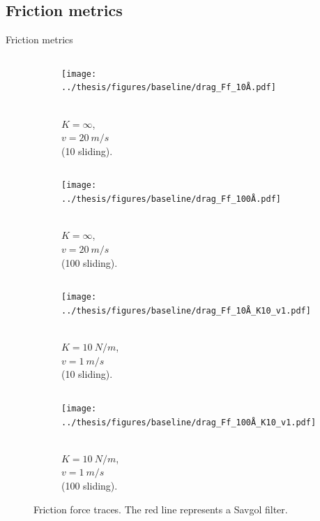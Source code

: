 \documentclass[
	10pt, %
]{beamer}
\begin{document}
\subsection{Friction metrics}
\begin{frame}{Friction metrics}

\begin{figure}[H]
	\centering
	\begin{subfigure}[t]{0.49\textwidth}
		\centering
		\begin{columns}
			\caption{\scriptsize \\ \vspace*{1mm}  $K = \infty$, \\ $v = \SI{20}{m/s}$ \\ (\SI{10}{} sliding).}
			\texttt{[image: ../thesis/figures/baseline/drag\_Ff\_10Å.pdf]}
		\end{columns}
	\end{subfigure}
	\hfill
	\begin{subfigure}[t]{0.49\textwidth}
		\centering
		\begin{columns}
			\column{.7\linewidth}
			\texttt{[image: ../thesis/figures/baseline/drag\_Ff\_100Å.pdf]}
			\column{.3\linewidth}
			\caption{\scriptsize \\ \vspace*{1mm} $K = \infty$, \\ $v = \SI{20}{m/s}$ \\ (\SI{100}{} sliding).}
		\end{columns}
	  \end{subfigure}
	\hfill
	\begin{subfigure}[t]{0.49\textwidth}
		\centering
		\begin{columns}
			\column{.3\linewidth}
			\caption{\scriptsize \\ \vspace*{1mm} $K = \SI{10}{N/m}$, \\ $v = \SI{1}{m/s}$ \\ (\SI{10}{} sliding).}
			\texttt{[image: ../thesis/figures/baseline/drag\_Ff\_10Å\_K10\_v1.pdf]}
		\end{columns}
	\end{subfigure}
	\hfill
	\begin{subfigure}[t]{0.49\textwidth}
		\centering
		\begin{columns}
			\column{.7\linewidth}
			\texttt{[image: ../thesis/figures/baseline/drag\_Ff\_100Å\_K10\_v1.pdf]}
			\caption{\scriptsize \\ \vspace*{1mm}  $K = \SI{10}{N/m}$, \\ $v = \SI{1}{m/s}$ \\ (\SI{100}{} sliding).}
		\end{columns}

	\end{subfigure}
	   \caption{Friction force traces. The red line represents a Savgol filter.}
  \end{figure}
\end{frame}
%
%
\end{document}
